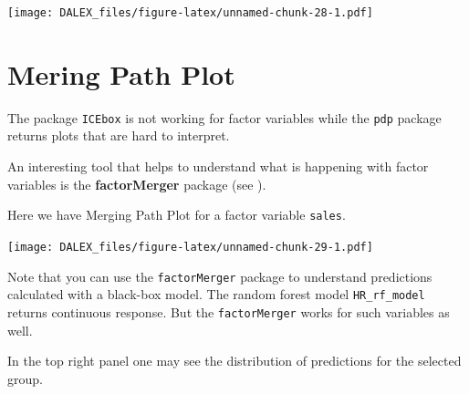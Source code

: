 \documentclass[]{book}
\newenvironment{Shaded}{\begin{snugshade}}{\end{snugshade}}
\newcommand{\KeywordTok}[1]{\textcolor[rgb]{0.13,0.29,0.53}{\textbf{#1}}}
\newcommand{\DataTypeTok}[1]{\textcolor[rgb]{0.13,0.29,0.53}{#1}}
\newcommand{\StringTok}[1]{\textcolor[rgb]{0.31,0.60,0.02}{#1}}
\newcommand{\OtherTok}[1]{\textcolor[rgb]{0.56,0.35,0.01}{#1}}
\newcommand{\OperatorTok}[1]{\textcolor[rgb]{0.81,0.36,0.00}{\textbf{#1}}}
\newcommand{\NormalTok}[1]{#1}
\theoremstyle{definition}
\theoremstyle{definition}
\theoremstyle{definition}
\theoremstyle{remark}
\begin{document}
\texttt{[image: DALEX\_files/figure-latex/unnamed-chunk-28-1.pdf]}

\section{Mering Path Plot}\label{mering-path-plot}

The package \texttt{ICEbox} is not working for factor variables while
the \texttt{pdp} package returns plots that are hard to interpret.

An interesting tool that helps to understand what is happening with
factor variables is the \textbf{factorMerger} package (see
\citep{factorMerger}).

Here we have Merging Path Plot for a factor variable \texttt{sales}.

\begin{Shaded}
\end{Shaded}

\texttt{[image: DALEX\_files/figure-latex/unnamed-chunk-29-1.pdf]}

Note that you can use the \texttt{factorMerger} package to understand
predictions calculated with a black-box model. The random forest model
\texttt{HR\_rf\_model} returns continuous response. But the
\texttt{factorMerger} works for such variables as well.

In the top right panel one may see the distribution of predictions for
the selected group.

\begin{Shaded}
\end{Shaded}
\end{document}
